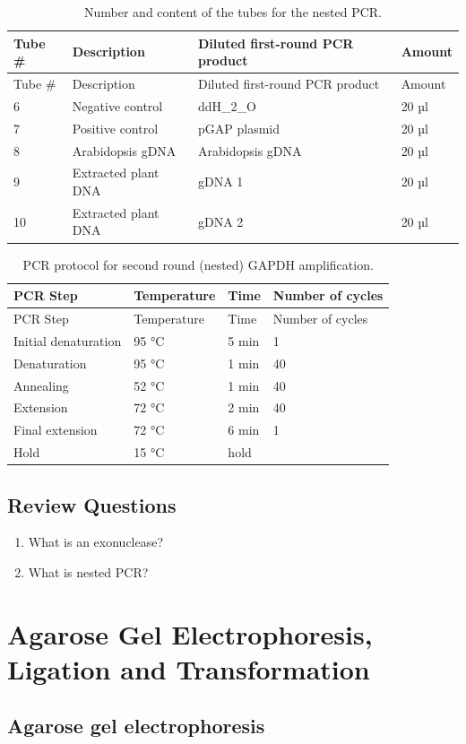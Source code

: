 \documentclass[]{book}
\providecommand{\tightlist}{%
  \setlength{\itemsep}{0pt}\setlength{\parskip}{0pt}}
\begin{document}
\begin{longtable}[]{@{}llll@{}}
\caption{\label{tab:nestedtubes} Number and content of the tubes for the
nested PCR.}\tabularnewline
\toprule
Tube \# & Description & Diluted first-round PCR product &
Amount\tabularnewline
\midrule
\endfirsthead
\toprule
Tube \# & Description & Diluted first-round PCR product &
Amount\tabularnewline
\midrule
\endhead
6 & Negative control & ddH\_2\_O & 20 µl\tabularnewline
7 & Positive control & pGAP plasmid & 20 µl\tabularnewline
8 & Arabidopsis gDNA & Arabidopsis gDNA & 20 µl\tabularnewline
9 & Extracted plant DNA & gDNA 1 & 20 µl\tabularnewline
10 & Extracted plant DNA & gDNA 2 & 20 µl\tabularnewline
\bottomrule
\end{longtable}

\begin{longtable}[]{@{}llll@{}}
\caption{\label{tab:nestedpcr} PCR protocol for second round (nested) GAPDH
amplification.}\tabularnewline
\toprule
PCR Step & Temperature & Time & Number of cycles\tabularnewline
\midrule
\endfirsthead
\toprule
PCR Step & Temperature & Time & Number of cycles\tabularnewline
\midrule
\endhead
Initial denaturation & 95 °C & 5 min & 1\tabularnewline
Denaturation & 95 °C & 1 min & 40\tabularnewline
Annealing & 52 °C & 1 min & 40\tabularnewline
Extension & 72 °C & 2 min & 40\tabularnewline
Final extension & 72 °C & 6 min & 1\tabularnewline
Hold & 15 °C & hold &\tabularnewline
\bottomrule
\end{longtable}

\section{Review Questions}\label{review-questions-6}

\begin{enumerate}
\def\labelenumi{\arabic{enumi}.}
\tightlist
\item
  What is an exonuclease?
\item
  What is nested PCR?
\end{enumerate}

\chapter{Agarose Gel Electrophoresis, Ligation and
Transformation}\label{agarose-gel-electrophoresis-ligation-and-transformation}

\section{Agarose gel electrophoresis}\label{agarose-gel-electrophoresis}
\end{document}
